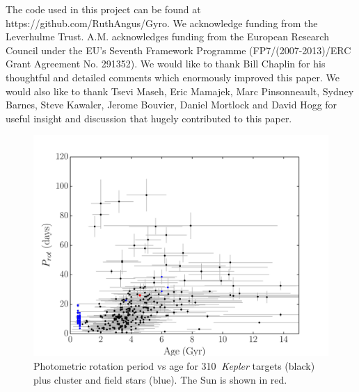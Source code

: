 \documentclass[11pt,preprint]{aastex}
\newcommand{\nastero}{310}
\begin{document}
The code used in this project can be found at
https://github.com/RuthAngus/Gyro.
We acknowledge funding from the Leverhulme Trust.
A.M. acknowledges funding from the European Research Council under the EU’s
Seventh Framework Programme (FP7/(2007-2013)/ERC Grant Agreement No. 291352).
We would like to thank Bill Chaplin for his thoughtful and detailed comments
which enormously improved this paper.
We would also like to thank Tsevi Maseh, Eric Mamajek, Marc Pinsonneault,
Sydney Barnes, Steve Kawaler, Jerome Bouvier, Daniel Mortlock and David Hogg
for useful insight and discussion that hugely contributed to this paper.




\begin{figure}[ht]
\begin{center}
\includegraphics[width=6in, clip=true, trim=0 0 0.5in 0]{p_vs_a_paper2.pdf}
\caption{Photometric rotation period vs age for \nastero$~$ {\it Kepler}
	targets (black) plus cluster and field stars (blue). The Sun is shown
	in red.
\label{fig:p_vs_a}}
\end{center}
\end{figure}
\end{document}
